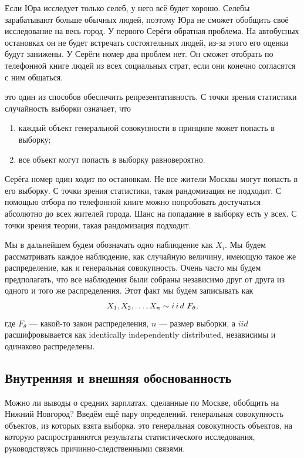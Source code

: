 \documentclass[12pt, a4paper, oneside]{article}
\begin{document}
Если Юра исследует только селеб, у него всё будет хорошо. Селебы зарабатывают больше обычных людей, поэтому Юра не сможет обобщить своё исследование на весь город. У первого Серёги обратная проблема. На автобусных остановках он не будет встречать состоятельных людей, из-за этого его оценки будут занижены. У Серёги номер два проблем нет. Он сможет отобрать по телефонной книге людей из всех социальных страт, если они конечно согласятся с ним общаться. 

 это один из способов обеспечить репрезентативность. С точки зрения статистики случайность выборки означает, что 

\begin{enumerate} 
\item каждый объект генеральной совокупности в принципе может попасть в выборку;
\item все объект могут попасть в выборку равновероятно.
\end{enumerate}

Серёга номер один ходит по остановкам. Не все жители Москвы могут попасть в его выборку. С точки зрения статистики, такая рандомизация не подходит. С помощью отбора по телефонной книге можно попробовать достучаться абсолютно до всех жителей города. Шанс на попадание в выборку есть у всех. С точки зрения теории, такая рандомизация подходит. 

Мы в дальнейшем будем обозначать одно наблюдение как $X_i$. Мы будем рассматривать каждое наблюдение, как случайную величину, имеющую такое же распределение, как и генеральная совокупность. Очень часто мы будем предполагать, что все наблюдения были собраны независимо друг от друга из одного и того же распределения. Этот факт мы будем записывать как \[ X_1, X_2, \ldots, X_n \sim i\,i\,d\,\, F_{\theta},\] где $F_{\theta}$ --- какой-то закон распределения, $n$ --- размер выборки, а $iid$ расшифровывается как identically independently distributed, независимы и одинаково распределены.


\subsection{Внутренняя и внешняя обоснованность}

Можно ли выводы о средних зарплатах, сделанные по Москве, обобщить на Нижний Новгород? Введём ещё пару определений.  генеральная совокупность объектов, из которых взята выборка.  это генеральная совокупность объектов, на которую распространяются результаты статистического исследования, руководствуясь причинно-следственными связями.
\end{document}
